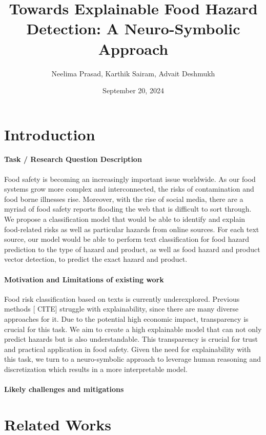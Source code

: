 \documentclass{article}
\title{Towards Explainable Food Hazard Detection: A Neuro-Symbolic Approach}
\author{Neelima Prasad, Karthik Sairam, Advait Deshmukh}
\date{September 20, 2024}
\begin{document}
\maketitle

\section{Introduction}
\paragraph{Task / Research Question Description}
Food safety is becoming an increasingly important issue worldwide. As our food systems grow more complex and interconnected, the risks of contamination and food borne illnesses rise. Moreover, with the rise of social media, there are a myriad of food safety reports flooding the web that is difficult to sort through. We propose a classification model that would be able to identify and explain food-related risks as well as particular hazards from online sources. For each text source, our model would be able to perform text classification for food hazard prediction to the type of hazard and product, as well as food hazard and product vector detection, to predict the exact hazard and product.

\paragraph{Motivation and Limitations of existing work}
Food risk classification based on texts is currently underexplored. Previous methods [ CITE] struggle with explainability, since there are many diverse approaches for it. Due to the potential high economic impact, transparency is crucial for this task. We aim to create a high explainable model that can not only predict hazards but is also understandable. This transparency is crucial for trust and practical application in food safety. Given the need for explainability with this task, we turn to a neuro-symbolic approach to leverage human reasoning and discretization which results in a more interpretable model. 

\paragraph{Likely challenges and mitigations}

\section{Related Works}
\end{document}

